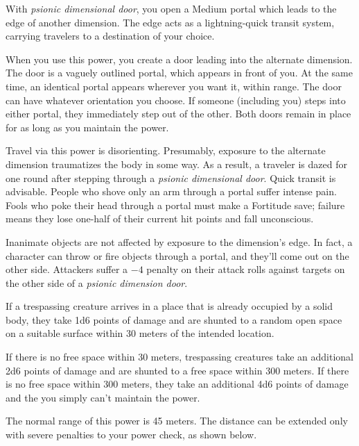 {
	With \emph{psionic dimensional door}, you open a Medium portal which leads to the edge of another dimension. The edge acts as a lightning-quick transit system, carrying travelers to a destination of your choice.

	When you use this power, you create a door leading into the alternate dimension. The door is a vaguely outlined portal, which appears in front of you. At the same time, an identical portal appears wherever you want it, within range. The door can have whatever orientation you choose. If someone (including you) steps into either portal, they immediately step out of the other. Both doors remain in place for as long as you maintain the power.


	Travel via this power is disorienting. Presumably, exposure to the alternate dimension traumatizes the body in some way. As a result, a traveler is dazed for one round after stepping through a \emph{psionic dimensional door}. Quick transit is advisable. People who shove only an arm through a portal suffer intense pain. Fools who poke their head through a portal must make a Fortitude save; failure means they lose one-half of their current hit points and fall unconscious.

	Inanimate objects are not affected by exposure to the dimension's edge. In fact, a character can throw or fire objects through a portal, and they'll come out on the other side. Attackers suffer a $-4$ penalty on their attack rolls against targets on the other side of a \emph{psionic dimension door}.

	If a trespassing creature arrives in a place that is already occupied by a solid body, they take 1d6 points of damage and are shunted to a random open space on a suitable surface within 30 meters of the intended location.

	If there is no free space within 30 meters, trespassing creatures take an additional 2d6 points of damage and are shunted to a free space within 300 meters. If there is no free space within 300 meters, they take an additional 4d6 points of damage and the you simply can't maintain the power.

	The normal range of this power is 45 meters. The distance can be extended only with severe penalties to your power check, as shown below.

}